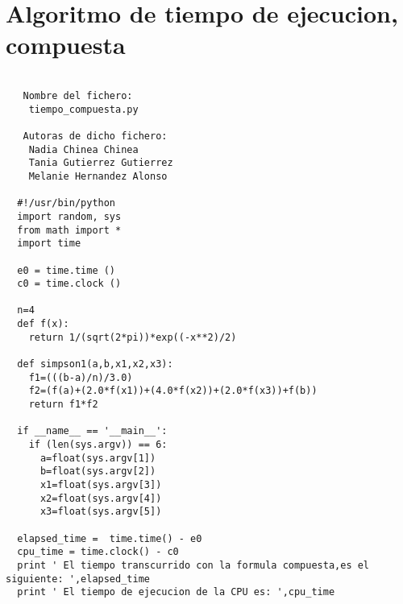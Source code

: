       
\section{Algoritmo de tiempo de ejecucion, compuesta}
\label{sec4}
\begin{center}
\begin{footnotesize}
\begin{verbatim}
   
   Nombre del fichero:
    tiempo_compuesta.py

   Autoras de dicho fichero:
    Nadia Chinea Chinea 
    Tania Gutierrez Gutierrez 
    Melanie Hernandez Alonso

  #!/usr/bin/python
  import random, sys
  from math import *
  import time
  
  e0 = time.time ()
  c0 = time.clock ()
 
  n=4
  def f(x):
    return 1/(sqrt(2*pi))*exp((-x**2)/2)
  
  def simpson1(a,b,x1,x2,x3):
    f1=(((b-a)/n)/3.0)
    f2=(f(a)+(2.0*f(x1))+(4.0*f(x2))+(2.0*f(x3))+f(b))
    return f1*f2 
      
  if __name__ == '__main__':
    if (len(sys.argv)) == 6:
      a=float(sys.argv[1])
      b=float(sys.argv[2])
      x1=float(sys.argv[3])
      x2=float(sys.argv[4])
      x3=float(sys.argv[5])
 
  elapsed_time =  time.time() - e0
  cpu_time = time.clock() - c0
  print ' El tiempo transcurrido con la formula compuesta,es el siguiente: ',elapsed_time
  print ' El tiempo de ejecucion de la CPU es: ',cpu_time
\end{verbatim}
\end{footnotesize}
\end{center}


